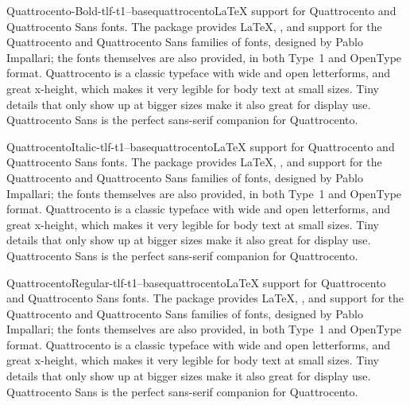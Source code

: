 \documentclass{ddltxtyp}
\begin{document}
\begin{package}{Quattrocento-Bold-tlf-t1--base}{quattrocento}{{\LaTeX} support for Quattrocento and Quattrocento Sans fonts.}
The package provides {\LaTeX}, {\pdfLaTeX}, {\XeLaTeX} and {\LuaLaTeX}
support for the Quattrocento and Quattrocento Sans families of
fonts, designed by Pablo Impallari; the fonts themselves are
also provided, in both Type~1 and OpenType format. Quattrocento
is a classic typeface with wide and open letterforms, and great
x-height, which makes it very legible for body text at small
sizes. Tiny details that only show up at bigger sizes make it
also great for display use. Quattrocento Sans is the perfect
sans-serif companion for Quattrocento.
\end{package}
\begin{package}{QuattrocentoItalic-tlf-t1--base}{quattrocento}{{\LaTeX} support for Quattrocento and Quattrocento Sans fonts.}
The package provides {\LaTeX}, {\pdfLaTeX}, {\XeLaTeX} and {\LuaLaTeX}
support for the Quattrocento and Quattrocento Sans families of
fonts, designed by Pablo Impallari; the fonts themselves are
also provided, in both Type~1 and OpenType format. Quattrocento
is a classic typeface with wide and open letterforms, and great
x-height, which makes it very legible for body text at small
sizes. Tiny details that only show up at bigger sizes make it
also great for display use. Quattrocento Sans is the perfect
sans-serif companion for Quattrocento.
\end{package}
\begin{package}{QuattrocentoRegular-tlf-t1--base}{quattrocento}{{\LaTeX} support for Quattrocento and Quattrocento Sans fonts.}
The package provides {\LaTeX}, {\pdfLaTeX}, {\XeLaTeX} and {\LuaLaTeX}
support for the Quattrocento and Quattrocento Sans families of
fonts, designed by Pablo Impallari; the fonts themselves are
also provided, in both Type~1 and OpenType format. Quattrocento
is a classic typeface with wide and open letterforms, and great
x-height, which makes it very legible for body text at small
sizes. Tiny details that only show up at bigger sizes make it
also great for display use. Quattrocento Sans is the perfect
sans-serif companion for Quattrocento.
\end{package}
\end{document}
